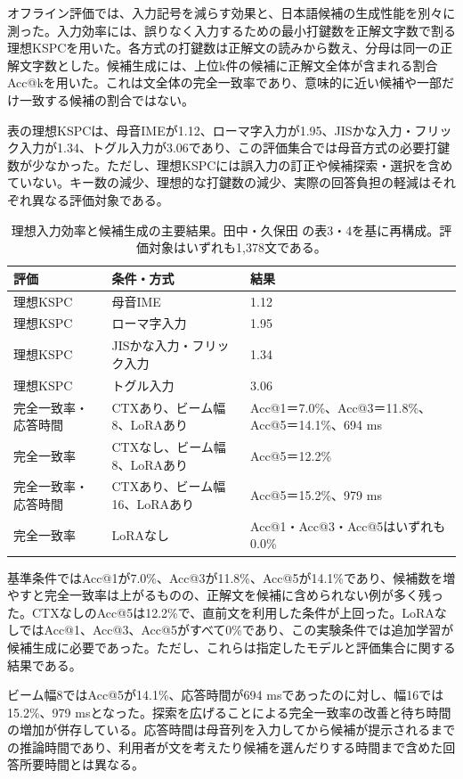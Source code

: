 オフライン評価では、入力記号を減らす効果と、日本語候補の生成性能を別々に測った。入力効率には、誤りなく入力するための最小打鍵数を正解文字数で割る理想KSPCを用いた。各方式の打鍵数は正解文の読みから数え、分母は同一の正解文字数とした。候補生成には、上位k件の候補に正解文全体が含まれる割合Acc@kを用いた。これは文全体の完全一致率であり、意味的に近い候補や一部だけ一致する候補の割合ではない。

表の理想KSPCは、母音IMEが1.12、ローマ字入力が1.95、JISかな入力・フリック入力が1.34、トグル入力が3.06であり、この評価集合では母音方式の必要打鍵数が少なかった。ただし、理想KSPCには誤入力の訂正や候補探索・選択を含めていない。キー数の減少、理想的な打鍵数の減少、実際の回答負担の軽減はそれぞれ異なる評価対象である。

\begin{table}[tbp]
  \centering
  \caption{理想入力効率と候補生成の主要結果。田中・久保田 \autocite{tanaka2026fss}の表3・4を基に再構成。評価対象はいずれも1,378文である。}
  \label{tab:fss-results}
  \begin{tabular}{lp{40mm}p{55mm}}
    \hline
    評価 & 条件・方式 & 結果 \\
    \hline
    理想KSPC & 母音IME & 1.12 \\
    理想KSPC & ローマ字入力 & 1.95 \\
    理想KSPC & JISかな入力・フリック入力 & 1.34 \\
    理想KSPC & トグル入力 & 3.06 \\
    完全一致率・応答時間 & CTXあり、ビーム幅8、LoRAあり & Acc@1＝7.0\%、Acc@3＝11.8\%、Acc@5＝14.1\%、694 ms \\
    完全一致率 & CTXなし、ビーム幅8、LoRAあり & Acc@5＝12.2\% \\
    完全一致率・応答時間 & CTXあり、ビーム幅16、LoRAあり & Acc@5＝15.2\%、979 ms \\
    完全一致率 & LoRAなし & Acc@1・Acc@3・Acc@5はいずれも0.0\% \\
    \hline
  \end{tabular}
\end{table}

基準条件ではAcc@1が7.0\%、Acc@3が11.8\%、Acc@5が14.1\%であり、候補数を増やすと完全一致率は上がるものの、正解文を候補に含められない例が多く残った。CTXなしのAcc@5は12.2\%で、直前文を利用した条件が上回った。LoRAなしではAcc@1、Acc@3、Acc@5がすべて0\%であり、この実験条件では追加学習が候補生成に必要であった。ただし、これらは指定したモデルと評価集合に関する結果である。

ビーム幅8ではAcc@5が14.1\%、応答時間が694 msであったのに対し、幅16では15.2\%、979 msとなった。探索を広げることによる完全一致率の改善と待ち時間の増加が併存している。応答時間は母音列を入力してから候補が提示されるまでの推論時間であり、利用者が文を考えたり候補を選んだりする時間まで含めた回答所要時間とは異なる。

